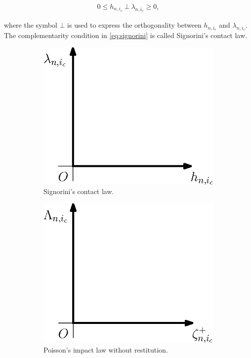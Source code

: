 \documentclass[../DC2017114Bouma.tex]{subfiles}
\begin{document}
\begin{align}
0\leq h_{n,i_c}\ \bot\ \lambda_{n,i_c} \geq 0,\label{eq:signorini}
\end{align}

where the symbol $\bot$ is used to express the orthogonality between $h_{n,i_c}$ and $\lambda_{n,i_c}$. The complementarity condition in \eqref{eq:signorini} is called Signorini's contact law.
\begin{figure}[h]
\centering
\begin{subfigure}{0.3\textwidth}
\centering
\includegraphics[width=\linewidth]{signorinicontact.eps}
\caption{Signorini's contact law.}\label{fig:signorinicontact}
\end{subfigure}
\qquad
\begin{subfigure}{0.3\textwidth}
\centering
\includegraphics[width=\linewidth]{poissonimpact.eps}
\caption{Poisson's impact law without restitution.}\label{fig:poissonimpact}
\end{subfigure}
\caption{}
\end{figure}
\end{document}
